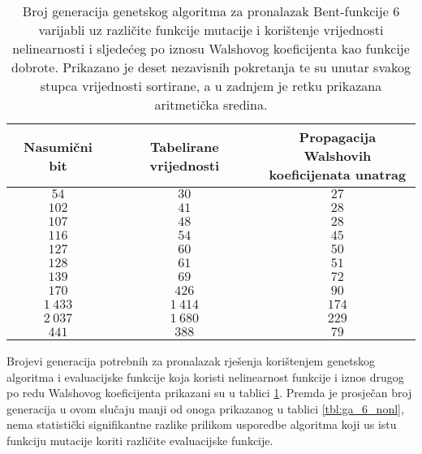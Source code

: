 \begin{table}[]
    \centering
    \captionsetup{justification=centering}
    \caption{Broj generacija genetskog algoritma za pronalazak Bent-funkcije $6$ varijabli uz različite funkcije mutacije i korištenje vrijednosti nelinearnosti i sljedećeg po iznosu Walshovog koeficijenta kao funkcije dobrote. Prikazano je deset nezavisnih pokretanja te su unutar svakog stupca vrijednosti sortirane, a u zadnjem je retku prikazana aritmetička sredina.}
    \begin{tabular}{ccc} \hline
        Nasumični bit & Tabelirane vrijednosti & \makecell{Propagacija Walshovih \\ koeficijenata unatrag} \\ \hline
            $54$ &     $30$ &  $27$ \\
           $102$ &     $41$ &  $28$ \\
           $107$ &     $48$ &  $28$ \\
           $116$ &     $54$ &  $45$ \\
           $127$ &     $60$ &  $50$ \\
           $128$ &     $61$ &  $51$ \\
           $139$ &     $69$ &  $72$ \\
           $170$ &    $426$ &  $90$ \\
        $1\:433$ & $1\:414$ & $174$ \\
        $2\:037$ & $1\:680$ & $229$ \\ \hline
           $441$ &    $388$ &  $79$
    \end{tabular}
    \label{tbl:ga_6_nonlV2}
\end{table}

Brojevi generacija potrebnih za pronalazak rješenja korištenjem genetskog algoritma i evaluacijske funkcije koja koristi nelinearnost funkcije i iznos drugog po redu Walshovog koeficijenta prikazani su u tablici \ref{tbl:ga_6_nonlV2}.
Premda je prosječan broj generacija u ovom slučaju manji od onoga prikazanog u tablici \ref{tbl:ga_6_nonl}, nema statistički signifikantne razlike prilikom usporedbe algoritma koji us istu funkciju mutacije koriti različite evaluacijske funkcije.

